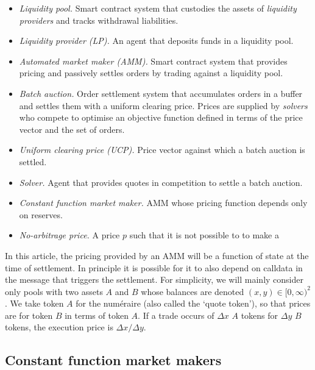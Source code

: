 \documentclass[a4paper,10pt]{article}
\begin{document}
\begin{itemize}

  \item \emph{Liquidity pool.} Smart contract system that custodies the assets of \emph{liquidity providers} and tracks withdrawal liabilities.
  
  \item \emph{Liquidity provider (LP).} An agent that deposits funds in a liquidity pool.
  
  \item \emph{Automated market maker (AMM).} Smart contract system that provides pricing and passively settles orders by trading against a liquidity pool.
  
  \item \emph{Batch auction.} Order settlement system that accumulates orders in a buffer and settles them with a uniform clearing price.
  Prices are supplied by \emph{solvers} who compete to optimise an objective function defined in terms of the price vector and the set of orders.
  
  \item \emph{Uniform clearing price (UCP).} Price vector against which a batch auction is settled.
  
  \item \emph{Solver.} Agent that provides quotes in competition to settle a batch auction.
  
  \item \emph{Constant function market maker.} AMM whose pricing function depends only on reserves.
  
  \item \emph{No-arbitrage price.} A price $p$ such that it is not possible to to make a 
  
\end{itemize}

In this article, the pricing provided by an AMM will be a function of state at the time of settlement. In principle it is possible for it to also depend on calldata in the message that triggers the settlement.
%
For simplicity, we will mainly consider only pools with two assets $A$ and $B$ whose balances are denoted $(x,y)\in [0,\infty)^2$.
%
We take token $A$ for the num\'eraire (also called the `quote token'), so that prices are for token $B$ in terms of token $A$.
%
If a trade occurs of $\Delta x$ $A$ tokens for $\Delta y$ $B$ tokens, the execution price is $\Delta x/\Delta y$.

\subsection{Constant function market makers}
\end{document}
